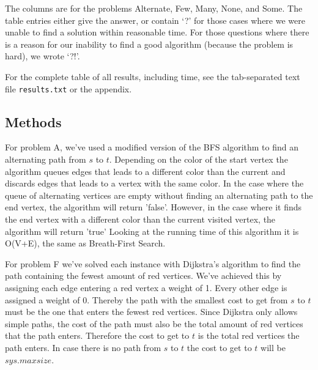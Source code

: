 \documentclass{tufte-handout}
\begin{document}
The columns are for the problems Alternate, Few, Many, None, and Some.
The table entries either give the answer, or contain `?' for those cases where we were unable to find a solution within reasonable time.
For those questions where there is a reason for our inability to find a good algorithm (because the problem is hard), we wrote `?!'.

For the complete table of all results, including time, see the tab-separated text file {\tt results.txt} or the appendix.

\subsection{Methods}
For problem A, we've used a modified version of the BFS algorithm to find an alternating path from $s$ to $t$. Depending on the color of the start vertex the algorithm queues edges that leads to a different color than the current and discards edges that leads to a vertex with the same color. In the case where the queue of alternating vertices are empty without finding an alternating path to the end vertex, the algorithm will return 'false'. However, in the case where it finds the end vertex with a different color than the current visited vertex, the algorithm will return 'true'
Looking at the running time of this algorithm it is O(V+E), the same as Breath-First Search.

For problem F we've solved each instance with Dijkstra's algorithm to find the path containing the fewest amount of red vertices. We've achieved this by assigning each edge entering a red vertex a weight of 1. Every other edge is assigned a weight of 0. Thereby the path with the smallest cost to get from $s$ to $t$ must be the one that enters the fewest red vertices. Since Dijkstra only allows simple paths, the cost of the path must also be the total amount of red vertices that the path enters. Therefore the cost to get to $t$ is the total red vertices the path enters. In case there is no path from $s$ to $t$ the cost to get to $t$ will be $sys.maxsize$.
\end{document}
